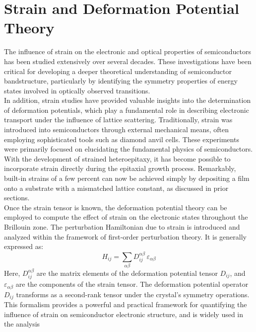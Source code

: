 \section{Strain and Deformation Potential Theory}
The influence of strain on the electronic and optical properties of semiconductors has been studied extensively over several decades. These investigations have been critical for developing a deeper theoretical understanding of semiconductor bandstructure, particularly by identifying the symmetry properties of energy states involved in optically observed transitions.\\
In addition, strain studies have provided valuable insights into the determination of deformation potentials, which play a fundamental role in describing electronic transport under the influence of lattice scattering. Traditionally, strain was introduced into semiconductors through external mechanical means, often employing sophisticated tools such as diamond anvil cells. These experiments were primarily focused on elucidating the fundamental physics of semiconductors.\\
With the development of strained heteroepitaxy, it has become possible to incorporate strain directly during the epitaxial growth process. Remarkably, built-in strains of a few percent can now be achieved simply by depositing a film onto a substrate with a mismatched lattice constant, as discussed in prior sections.\\
Once the strain tensor is known, the deformation potential theory can be employed to compute the effect of strain on the electronic states throughout the Brillouin zone. The perturbation Hamiltonian due to strain is introduced and analyzed within the framework of first-order perturbation theory. It is generally expressed as:
\begin{equation}
	H_{ij} = \sum_{\alpha\beta} D_{ij}^{\alpha\beta} \, \varepsilon_{\alpha\beta}
\end{equation}
Here, \( D_{ij}^{\alpha\beta} \) are the matrix elements of the deformation potential tensor \( D_{ij} \), and \( \varepsilon_{\alpha\beta} \) are the components of the strain tensor. The deformation potential operator \( D_{ij} \) transforms as a second-rank tensor under the crystal’s symmetry operations.\\
This formalism provides a powerful and practical framework for quantifying the influence of strain on semiconductor electronic structure, and is widely used in the analysis
